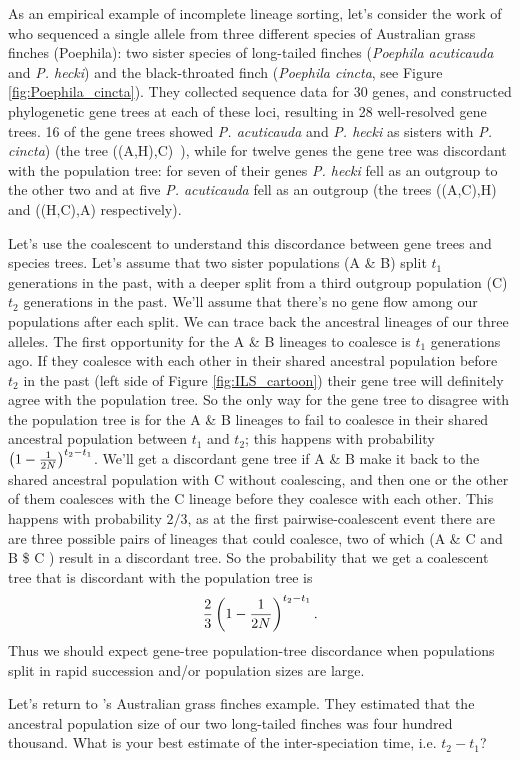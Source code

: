 As an empirical example of incomplete lineage sorting, let's consider the work of 
\citeauthor{jennings:05} who sequenced a single allele from three
different species of Australian grass finches (Poephila): two sister species
of long-tailed finches ({\it Poephila acuticauda} and {\it P. hecki})
and the black-throated finch ({\it Poephila cincta}, see Figure \ref{fig:Poephila_cincta}). They collected
sequence data for 30 genes, and constructed phylogenetic gene trees
at each of these loci, resulting in 28 well-resolved gene trees. 
16 of the gene trees showed {\it
  P. acuticauda} and {\it P. hecki} as sisters with {\it P. cincta})
(the tree ((A,H),C)~), while for twelve genes the gene tree was
discordant with the population tree: for seven of their genes  {\it P. hecki}
fell as an outgroup to the other two and at five {\it P. acuticauda} fell as an outgroup (the trees ((A,C),H) and
((H,C),A) respectively). 


Let's use the coalescent to understand this discordance between gene
trees and species trees. Let's assume that two sister populations
(A \& B) split $t_1$ generations in the past, with a
deeper split from a third outgroup population (C) $t_2$ generations in the
past. We'll assume that there's no gene flow among our populations
after each split. We can trace back the ancestral lineages of our three alleles. The
first opportunity for the A \& B lineages to coalesce is $t_1$
generations ago. If they coalesce with each other in their shared
ancestral population before $t_2$ in the past (left side of
Figure \ref{fig:ILS_cartoon}) their gene tree will
definitely agree with the population tree. So the only way for the gene
tree to disagree with the population tree is for the A \& B lineages
to fail to coalesce in their shared ancestral population between $t_1$ and  $t_2$; this happens
with probability $\left(1 - \nicefrac{1}{2N}\right)^{t_2-t_1}$. We'll
get a discordant gene tree if A
\& B make it back to the shared ancestral population with C without
coalescing, and then one or the other of them coalesces with the C lineage before they coalesce with each other. This happens with probability $2/3$, as at the first
pairwise-coalescent event there are are three possible pairs of lineages that could coalesce, two of
which (A \& C  and B \$ C ) result in a discordant tree. So the
probability that we get a coalescent tree that is discordant with the population tree is
\begin{equation}
\frac{2}{3} \left(1 - \nicefrac{1}{2N}\right)^{t_2-t_1}.
\end{equation}
Thus we should expect gene-tree population-tree discordance when populations split in rapid succession and/or population sizes are large. 
\begin{question}
Let's return to \citeauthor{jennings:05}'s Australian grass finches
example. They estimated that the ancestral population size of our two
long-tailed finches was four hundred thousand. What is your best
estimate of the inter-speciation time, i.e. $t_2-t_1$? 
\end{question}

